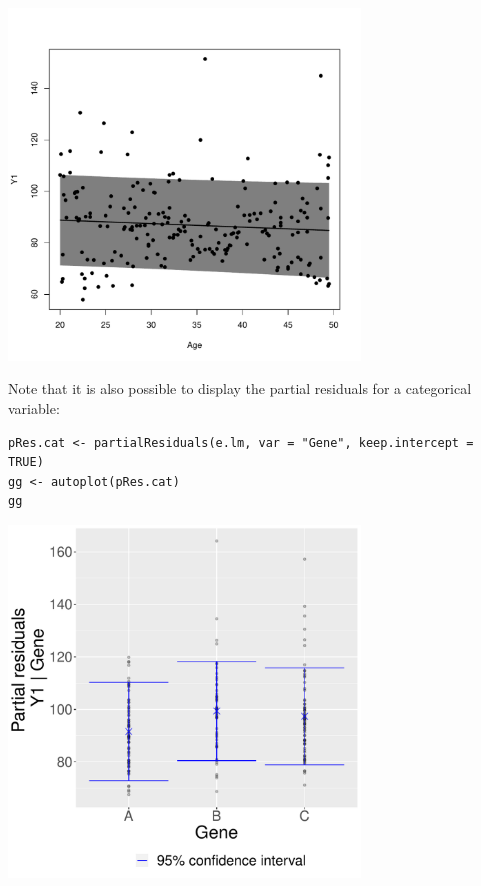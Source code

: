\documentclass[12pt]{article}
\begin{document}
\begin{center}
\includegraphics[width=0.7\textwidth]{./figures/fig-lava-plotConf.pdf}
\end{center}

Note that it is also possible to display the partial residuals for a
categorical variable:
\lstset{language=r,label= ,caption= ,captionpos=b,numbers=none}
\begin{lstlisting}
pRes.cat <- partialResiduals(e.lm, var = "Gene", keep.intercept = TRUE)
gg <- autoplot(pRes.cat)
gg
\end{lstlisting}


\begin{center}
\includegraphics[width=0.7\textwidth]{./figures/fig-butils-plotConf-categorical.pdf}
\end{center}
\end{document}
